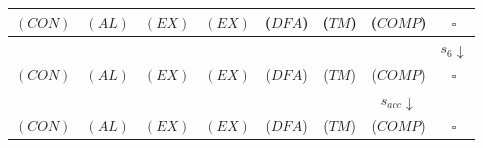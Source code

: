 \documentclass{article}
\begin{document}
\begin{center}
\begin{tabular}{|c|c|c|c|c|c|c|c|}
    \hline
    $(CON)$ & $(AL)$  & $(EX)$ & $(EX)$ & ($DFA$) & ($TM$) & ($COMP$) & $\square$\\
    \hline
    \multicolumn{7}{|c}{\phantom{A}} & \multicolumn{1}{c|}{$s_{6}\downarrow$} \\          
    \hline
    $(CON)$ & $(AL)$  & $(EX)$ & $(EX)$ & ($DFA$) & ($TM$) & ($COMP$) & $\square$\\
    \hline
    \multicolumn{6}{|c}{\phantom{A}} & \multicolumn{1}{c}{$s_{acc}\downarrow$} & \multicolumn{1}{c|}{\phantom{A}}\\          
    \hline
    $(CON)$ & $(AL)$  & $(EX)$ & $(EX)$ & ($DFA$) & ($TM$) & ($COMP$) & $\square$\\
    \hline
  \end{tabular}
\end{center}
\end{document}

